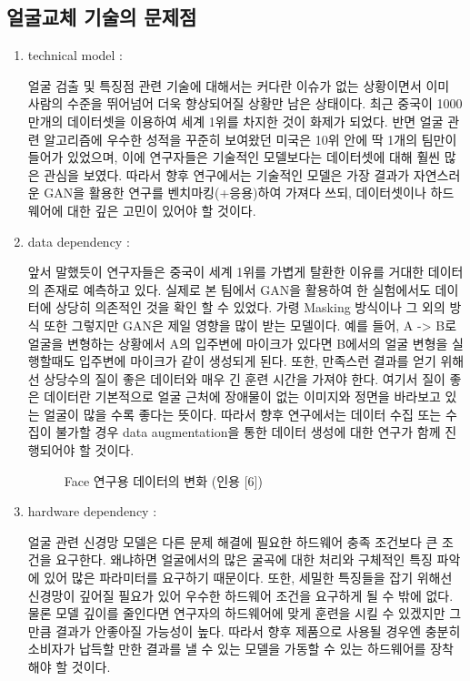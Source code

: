 \documentclass{oblivoir}
\begin{document}
\subsection{얼굴교체 기술의 문제점}
\begin{enumerate}
    \item technical model : 

    얼굴 검출 및 특징점 관련 기술에 대해서는 커다란 이슈가 없는 상황이면서 이미 사람의 수준을 뛰어넘어 더욱 향상되어질 상황만 남은 상태이다. 최근 중국이 1000만개의 데이터셋을 이용하여 세계 1위를 차지한 것이 화제가 되었다. 반면 얼굴 관련 알고리즘에 우수한 성적을 꾸준히 보여왔던 미국은 10위 안에 딱 1개의 팀만이 들어가 있었으며, 이에 연구자들은 기술적인 모델보다는 데이터셋에 대해 훨씬 많은 관심을 보였다. 따라서 향후 연구에서는 기술적인 모델은 가장 결과가 자연스러운 GAN을 활용한 연구를 벤치마킹(+응용)하여 가져다 쓰되, 데이터셋이나 하드웨어에 대한 깊은 고민이 있어야 할 것이다.

    \item data dependency : 

    앞서 말했듯이 연구자들은 중국이 세계 1위를 가볍게 탈환한 이유를 거대한 데이터의 존재로 예측하고 있다. 실제로 본 팀에서 GAN을 활용하여 한 실험에서도 데이터에 상당히 의존적인 것을 확인 할 수 있었다. 가령 Masking 방식이나 그 외의 방식 또한 그렇지만 GAN은 제일 영향을 많이 받는 모델이다. 예를 들어, A -> B로 얼굴을 변형하는 상황에서 A의 입주변에 마이크가 있다면 B에서의 얼굴 변형을 실행할때도 입주변에 마이크가 같이 생성되게 된다. 또한, 만족스런 결과를 얻기 위해선 상당수의 질이 좋은 데이터와 매우 긴 훈련 시간을 가져야 한다. 여기서 질이 좋은 데이터란 기본적으로 얼굴 근처에 장애물이 없는 이미지와 정면을 바라보고 있는 얼굴이 많을 수록 좋다는 뜻이다. 따라서 향후 연구에서는 데이터 수집 또는 수집이 불가할 경우 data augmentation을 통한 데이터 생성에 대한 연구가 함께 진행되어야 할 것이다.

    \begin{figure}[h!]
        \centering
    \caption{Face 연구용 데이터의 변화 (인용 [6])}
    \end{figure}

    \item hardware dependency : 

    얼굴 관련 신경망 모델은 다른 문제 해결에 필요한 하드웨어 충족 조건보다 큰 조건을 요구한다. 왜냐하면 얼굴에서의 많은 굴곡에 대한 처리와 구체적인 특징 파악에 있어 많은 파라미터를 요구하기 때문이다. 또한, 세밀한 특징들을 잡기 위해선 신경망이 깊어질 필요가 있어 우수한 하드웨어 조건을 요구하게 될 수 밖에 없다. 물론 모델 깊이를 줄인다면 연구자의 하드웨어에 맞게 훈련을 시킬 수 있겠지만 그만큼 결과가 안좋아질 가능성이 높다. 따라서 향후 제품으로 사용될 경우엔 충분히 소비자가 납득할 만한 결과를 낼 수 있는 모델을 가동할 수 있는 하드웨어를 장착해야 할 것이다. 


\end{enumerate}
\end{document}
